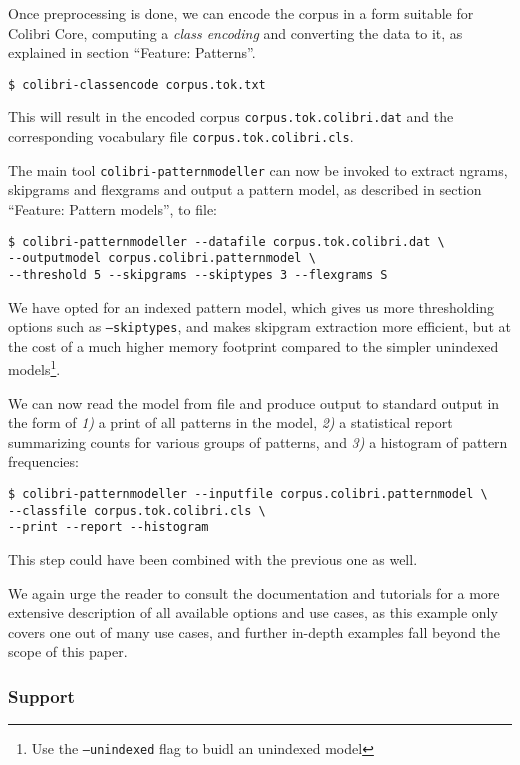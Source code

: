 \documentclass[a4paper,12pt]{article}
\begin{document}
Once preprocessing is done, we can encode the corpus in a form suitable for
Colibri Core, computing a \emph{class encoding} and converting the data to it,
as explained in section ``Feature: Patterns''.

\begin{verbatim}
$ colibri-classencode corpus.tok.txt 
\end{verbatim}

This will result in the encoded corpus \texttt{corpus.tok.colibri.dat} and the corresponding vocabulary file \texttt{corpus.tok.colibri.cls}.

The main tool \texttt{colibri-patternmodeller} can now be invoked to extract
ngrams, skipgrams and flexgrams and output a pattern model, as described in
section ``Feature: Pattern models'', to file:

\begin{verbatim}
$ colibri-patternmodeller --datafile corpus.tok.colibri.dat \
--outputmodel corpus.colibri.patternmodel \
--threshold 5 --skipgrams --skiptypes 3 --flexgrams S
\end{verbatim}

We have opted for an indexed pattern model, which gives us more thresholding
options such as \texttt{--skiptypes}, and makes skipgram extraction more
efficient, but at the cost of a much higher memory footprint compared to
the simpler unindexed models\footnote{Use the \texttt{--unindexed} flag to
buidl an unindexed model}.

We can now read the model from file and produce output to standard output in
the form of \emph{1)} a print of all patterns in the model, \emph{2)} a
statistical report summarizing counts for various groups of patterns, and
\emph{3)} a histogram of pattern frequencies:

\begin{verbatim}
$ colibri-patternmodeller --inputfile corpus.colibri.patternmodel \
--classfile corpus.tok.colibri.cls \
--print --report --histogram
\end{verbatim}

This step could have been combined with the previous one as well.

We again urge the reader to consult the documentation and tutorials for a more
extensive description of all available options and use cases, as this example
only covers one out of many use cases, and further in-depth examples fall beyond
the scope of this paper.

\subsubsection{Support} 
\end{document}

